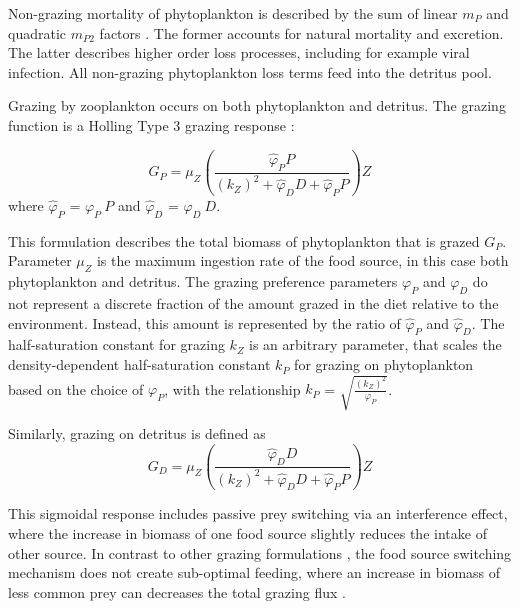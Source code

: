 \documentclass[journal abbreviation, manuscript]{copernicus}
\begin{document}
Non-grazing mortality of phytoplankton is described by the sum of linear $m_P$ and quadratic $m_{P2}$ factors \citep{Yool2011Medusa-1.0:Domain}. The former accounts for natural mortality and excretion. The latter describes higher order loss processes, including for example viral infection. All non-grazing phytoplankton loss terms feed into the detritus pool.

Grazing by zooplankton occurs on both phytoplankton and detritus. The grazing function is a Holling Type 3 grazing response \citep{Anderson2015c}:

\begin{equation}
    G_P = \mu_Z \left( \frac{ \hat{\varphi}_P P}{(k_Z)^2 + \hat{\varphi}_D D +\hat{\varphi}_P P}  \right) Z
\end{equation}
where $\hat{\varphi}_P$ = $\varphi_P \ P$ and $\hat{\varphi}_D$ = $\varphi_D \ D$.

This formulation describes the total biomass of phytoplankton that is grazed $G_P$. Parameter $\mu_Z$ is the maximum ingestion rate of the food source, in this case both phytoplankton and detritus.
The grazing preference parameters $\varphi_P$ and $\varphi_D$ do not represent a discrete fraction of the amount grazed in the diet relative to the environment. Instead, this amount is represented by the ratio of $\hat{\varphi}_P$ and $\hat{\varphi}_D$. 
The half-saturation constant for grazing $k_Z$ is an arbitrary parameter, that scales the density-dependent half-saturation constant $k_P$ for grazing on phytoplankton based on the choice of $\varphi_P$, with the relationship $k_P$ = $\sqrt{\frac{(k_Z)^2 }{\varphi_P}}$.

Similarly, grazing on detritus is defined as
\begin{equation}
    G_D = \mu_Z \left( \frac{ \hat{\varphi}_D D}{(k_Z)^2 + \hat{\varphi}_D D +\hat{\varphi}_P P}  \right) Z
\end{equation}

This sigmoidal response includes passive prey switching via an interference effect, where the increase in biomass of one food source slightly reduces the intake of other source. In contrast to other grazing formulations \citep[e.g.,][]{Fasham1990a}, the food source switching mechanism does not create sub-optimal feeding, where an increase in biomass of less common prey can decreases the total grazing flux \citep{Gentleman2003a}.
\end{document}
